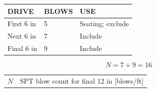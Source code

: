\documentclass[10pt]{article}
\begin{document}

{\ttfamily\footnotesize
\setlength{\tabcolsep}{4pt}
\renewcommand{\arraystretch}{1.1}
\begin{tabular}{|p{1.2in}|p{0.75in}|p{4.4in}|}
\hline
\bfseries DRIVE & \bfseries BLOWS & \bfseries USE \\ \hline
First 6 in & 5 & Seating; exclude \\ \hline
Next 6 in & 7 & Include \\ \hline
Final 6 in & 9 & Include \\ \hline
\end{tabular}
}

\begin{equation}
N=7+9=16
\end{equation}

{\ttfamily\footnotesize
\begin{tabular}{@{}ll@{}}
$N$ & SPT blow count for final 12 in [blows/ft] \\
\end{tabular}
}
\end{document}
